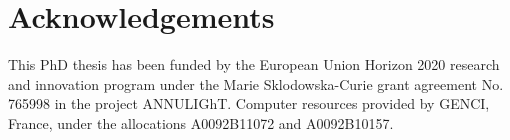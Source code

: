 \chapter*{Acknowledgements}
    
%

This PhD thesis has been funded by the European Union Horizon 2020 research and innovation program under the Marie Sklodowska-Curie grant agreement No. 765998 in the project ANNULIGhT. Computer resources provided by GENCI, France, under the allocations A0092B11072 and A0092B10157.


